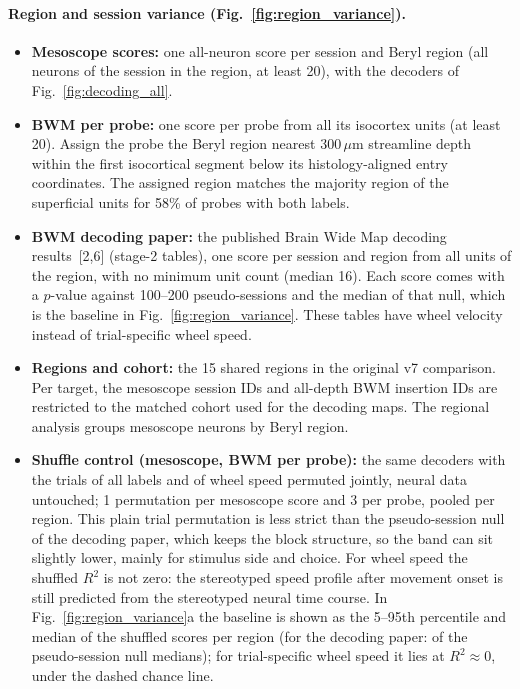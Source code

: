\documentclass[10pt]{article}
\newcommand{\um}{\,$\mu$m}
\newcommand{\figref}[1]{Fig.~\ref{fig:#1}}
\begin{document}
\paragraph{Region and session variance (\figref{region_variance}).}
\begin{itemize}
  \item \textbf{Mesoscope scores:} one all-neuron score per session and Beryl region (all neurons of the session in the region, at least 20), with the decoders of \figref{decoding_all}.
  \item \textbf{BWM per probe:} one score per probe from all its isocortex units (at least 20). Assign the probe the Beryl region nearest 300\um{} streamline depth within the first isocortical segment below its histology-aligned entry coordinates. The assigned region matches the majority region of the superficial units for 58\% of probes with both labels.
  \item \textbf{BWM decoding paper:} the published Brain Wide Map decoding results~[2,6] (stage-2 tables), one score per session and region from all units of the region, with no minimum unit count (median 16). Each score comes with a $p$-value against 100--200 pseudo-sessions and the median of that null, which is the baseline in \figref{region_variance}. These tables have wheel velocity instead of trial-specific wheel speed.
  \item \textbf{Regions and cohort:} the 15 shared regions in the original v7 comparison. Per target, the mesoscope session IDs and all-depth BWM insertion IDs are restricted to the matched cohort used for the decoding maps. The regional analysis groups mesoscope neurons by Beryl region.
  \item \textbf{Shuffle control (mesoscope, BWM per probe):} the same decoders with the trials of all labels and of wheel speed permuted jointly, neural data untouched; 1 permutation per mesoscope score and 3 per probe, pooled per region. This plain trial permutation is less strict than the pseudo-session null of the decoding paper, which keeps the block structure, so the band can sit slightly lower, mainly for stimulus side and choice. For wheel speed the shuffled $R^2$ is not zero: the stereotyped speed profile after movement onset is still predicted from the stereotyped neural time course. In \figref{region_variance}a the baseline is shown as the 5--95th percentile and median of the shuffled scores per region (for the decoding paper: of the pseudo-session null medians); for trial-specific wheel speed it lies at $R^2 \approx 0$, under the dashed chance line.

\end{itemize}
\end{document}

